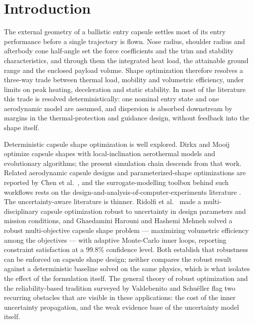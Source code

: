 \section{Introduction}
\label{sec:intro}

The external geometry of a ballistic entry capsule settles most of its entry
performance before a single trajectory is flown. Nose radius, shoulder radius
and afterbody cone half-angle set the force coefficients and the trim and
stability characteristics, and through them the integrated heat load, the
attainable ground range and the enclosed payload volume. Shape optimization
therefore resolves a three-way trade between thermal load, mobility and
volumetric efficiency, under limits on peak heating, deceleration and static
stability. In most of the literature this trade is resolved deterministically:
one nominal entry state and one aerodynamic model are assumed, and dispersion
is absorbed downstream by margins in the thermal-protection and guidance
design, without feedback into the shape itself.

Deterministic capsule shape optimization is well explored. Dirkx and Mooij
\cite{dirkx2014,dirkx2017entry} optimize capsule shapes with
local-inclination aerothermal models and evolutionary algorithms; the
present simulation chain descends from that work. Related aerodynamic
capsule designs and parameterized-shape optimizations are reported by Chen
et al.\ \cite{chen2015}, and the surrogate-modelling toolbox behind such
workflows \cite{forrester2008surrogate} rests on the
design-and-analysis-of-computer-experiments literature
\cite{sacks1989,jones1998}.
The uncertainty-aware literature is thinner. Ridolfi et al.\
\cite{ridolfi2012robust} made a multi-disciplinary capsule optimization
robust to uncertainty in design parameters and mission conditions, and
Ghaedamini Harouni and Hashemi Mehneh \cite{hashemi2019capsule} solved a
robust multi-objective capsule shape problem --- maximizing volumetric
efficiency among the objectives --- with adaptive Monte-Carlo inner loops,
reporting constraint satisfaction at a 99.8\% confidence level. Both
establish that robustness can be enforced on capsule shape design; neither
compares the robust result against a deterministic baseline solved on the
same physics, which is what isolates the effect of the formulation itself.
The general theory of robust optimization \cite{beyer2007robust} and the
reliability-based tradition surveyed by Valdebenito and Schu\"eller
\cite{valdebenito2010} flag two recurring obstacles that are visible in
these applications: the cost of the inner uncertainty propagation, and the
weak evidence base of the uncertainty model itself.

